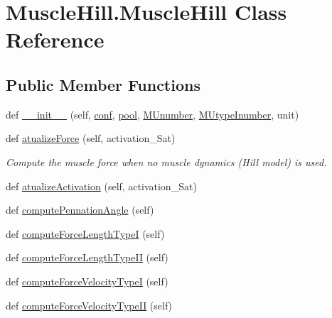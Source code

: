 \hypertarget{class_muscle_hill_1_1_muscle_hill}{}\section{Muscle\+Hill.\+Muscle\+Hill Class Reference}
\label{class_muscle_hill_1_1_muscle_hill}
\subsection*{Public Member Functions}
\begin{DoxyCompactItemize}
\item 
def \hyperlink{class_muscle_hill_1_1_muscle_hill_a850e338ee568e9956ca134d806c2b7c6}{\+\_\+\+\_\+init\+\_\+\+\_\+} (self, \hyperlink{class_muscle_hill_1_1_muscle_hill_a081599e4b3b4faf450f8c09e654ea188}{conf}, \hyperlink{class_muscle_hill_1_1_muscle_hill_ada7b7fe30c416aa6b7d957875ad81804}{pool}, \hyperlink{class_muscle_hill_1_1_muscle_hill_aad139563902bc26e0c69637ddc85c6b7}{M\+Unumber}, \hyperlink{class_muscle_hill_1_1_muscle_hill_ae7e7a4fe4112e6a88b04cfd8705e1374}{M\+Utype\+Inumber}, unit)
\item 
def \hyperlink{class_muscle_hill_1_1_muscle_hill_aa07ad41150b7f082dc49226650e705cb}{atualize\+Force} (self, activation\+\_\+\+Sat)
\begin{DoxyCompactList}\small\item\em Compute the muscle force when no muscle dynamics (Hill model) is used. \end{DoxyCompactList}\item 
def \hyperlink{class_muscle_hill_1_1_muscle_hill_a81d25a2541478817c39a6e2d720ac460}{atualize\+Activation} (self, activation\+\_\+\+Sat)
\item 
def \hyperlink{class_muscle_hill_1_1_muscle_hill_a5c3dfd4a663d327319335773c4908eef}{compute\+Pennation\+Angle} (self)
\item 
def \hyperlink{class_muscle_hill_1_1_muscle_hill_ab24d0c9566cf2a9a309debd1a1a63ee0}{compute\+Force\+Length\+TypeI} (self)
\item 
def \hyperlink{class_muscle_hill_1_1_muscle_hill_a99f5d396aeb1bb0b85def721c9b0bc25}{compute\+Force\+Length\+Type\+II} (self)
\item 
def \hyperlink{class_muscle_hill_1_1_muscle_hill_a5669a0ba569c4ab1acd31ac8bdf68b9f}{compute\+Force\+Velocity\+TypeI} (self)
\item 
def \hyperlink{class_muscle_hill_1_1_muscle_hill_ad6797f63b21b6b753cc5362dd066cc02}{compute\+Force\+Velocity\+Type\+II} (self)

\end{DoxyCompactItemize}
